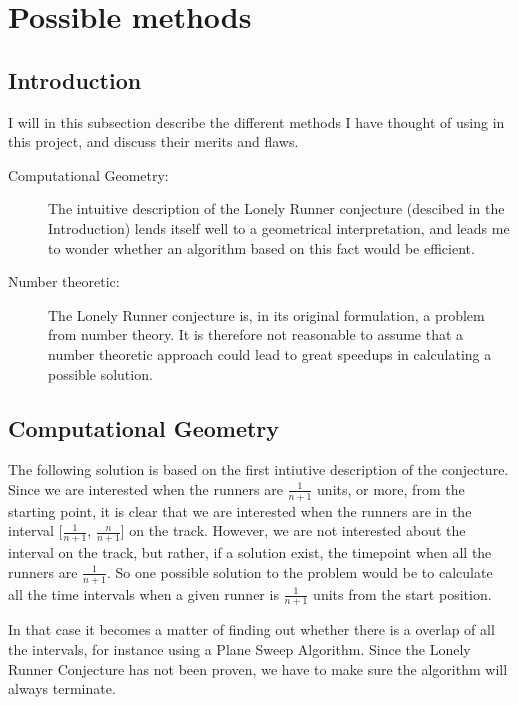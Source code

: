 \section{Possible methods}
\label{choiceOfMethod}

\subsection{Introduction}
I will in this subsection describe the different methods I have thought of using in this project, and discuss their merits and flaws.

\begin{description}
\item[Computational Geometry:] The intuitive description of the Lonely Runner conjecture (descibed in the Introduction) lends itself well to a geometrical interpretation, and leads me to wonder whether an algorithm based on this fact would be efficient.

\item[Number theoretic:] The Lonely Runner conjecture is, in its original formulation, a problem from number theory. It is therefore not reasonable to assume that a number theoretic approach could lead to great speedups in calculating a possible solution.
\end{description}

\subsection{Computational Geometry}
The following solution is based on the first intiutive description of the conjecture. Since we are interested when the runners are $\frac{1}{n + 1}$ units, or more, from the starting point, it is clear that we are interested when the runners are in the interval [$\frac{1}{n + 1}$, $\frac{n}{n + 1}$] on the track. However, we are not interested about the interval on the track, but rather, if a solution exist, the timepoint when all the runners are $\frac{1}{n+1}$. So one possible solution to the problem would be to calculate all the time intervals when a given runner is $\frac{1}{n+1}$ units from the start position. 

In that case it becomes a matter of finding out whether there is a overlap of all the intervals, for instance using a Plane Sweep Algorithm. Since the Lonely Runner Conjecture has not been proven, we have to make sure the algorithm will always terminate.  

